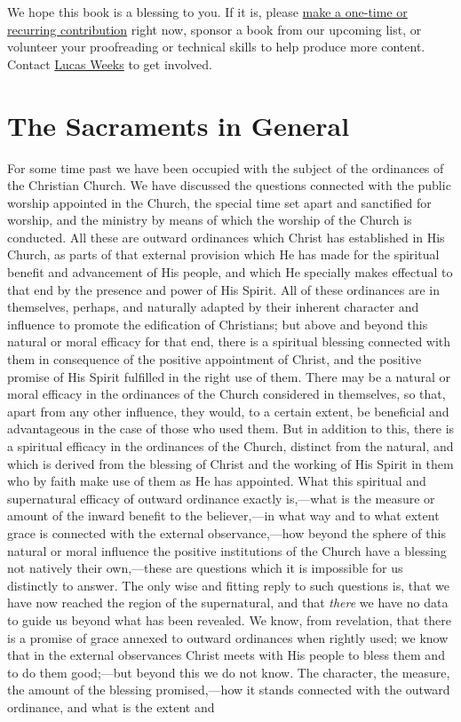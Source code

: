 \documentclass[
]{book}
\begin{document}
We hope this book is a blessing to you. If it is, please \href{https://warhornmedia.com/give}{make a one-time or recurring contribution} right now, sponsor a book from our upcoming list, or volunteer your proofreading or technical skills to help produce more content. Contact \href{mailto:lucas@beggarsborn.com}{Lucas Weeks} to get involved.

\mainmatter

\hypertarget{the-sacraments-in-general}{%
\chapter{The Sacraments in General}\label{the-sacraments-in-general}}

For some time past we have been occupied with the subject of the ordinances of the Christian Church. We have discussed the questions connected with the public worship appointed in the Church, the special time set apart and sanctified for worship, and the ministry by means of which the worship of the Church is conducted. All these are outward ordinances which Christ has established in His Church, as parts of that external provision which He has made for the spiritual benefit and advancement of His people, and which He specially makes effectual to that end by the presence and power of His Spirit. All of these ordinances are in themselves, perhaps, and naturally adapted by their inherent character and influence to promote the edification of Christians; but above and beyond this natural or moral efficacy for that end, there is a spiritual blessing connected with them in consequence of the positive appointment of Christ, and the positive promise of His Spirit fulfilled in the right use of them. There may be a natural or moral efficacy in the ordinances of the Church considered in themselves, so that, apart from any other influence, they would, to a certain extent, be beneficial and advantageous in the case of those who used them. But in addition to this, there is a spiritual efficacy in the ordinances of the Church, distinct from the natural, and which is derived from the blessing of Christ and the working of His Spirit in them who by faith make use of them as He has appointed. What this spiritual and supernatural efficacy of outward ordinance exactly is,---what is the measure or amount of the inward benefit to the believer,---in what way and to what extent grace is connected with the external observance,---how beyond the sphere of this natural or moral influence the positive institutions of the Church have a blessing not natively their own,---these are questions which it is impossible for us distinctly to answer. The only wise and fitting reply to such questions is, that we have now reached the region of the supernatural, and that \emph{there} we have no data to guide us beyond what has been revealed. We know, from revelation, that there is a promise of grace annexed to outward ordinances when rightly used; we know that in the external observances Christ meets with His people to bless them and to do them good;---but beyond this we do not know. The character, the measure, the amount of the blessing promised,---how it stands connected with the outward ordinance, and what is the extent and 
\end{document}
